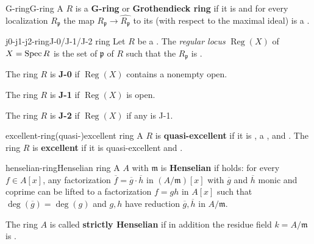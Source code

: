 \begin{topic}{G-ring}{G-ring}
    A  $R$ is a \textbf{G-ring} or \textbf{Grothendieck ring} if it is  and for every localization $R_{\mathfrak{p}}$ the map $R_{\mathfrak{p}} \to \widehat{R_{\mathfrak{p}}}$ to its  (with respect to the maximal ideal) is a .
\end{topic}

\begin{topic}{j0-j1-j2-ring}{J-0/J-1/J-2 ring}
    Let $R$ be a  . The \textit{regular locus} $\operatorname{Reg}(X)$ of $X = \operatorname{Spec} R$ is the set of  $\mathfrak{p}$ of $R$ such that the  $R_\mathfrak{p}$ is .
    
    The ring $R$ is \textbf{J-0} if $\operatorname{Reg}(X)$ contains a nonempty open.
    
    The ring $R$ is \textbf{J-1} if $\operatorname{Reg}(X)$ is open.
    
    The ring $R$ is \textbf{J-2} if $\operatorname{Reg}(X)$ if any  is J-1.
\end{topic}

\begin{topic}{excellent-ring}{(quasi-)excellent ring}
    A  $R$ is \textbf{quasi-excellent} if it is , a , and .
    The ring $R$ is \textbf{excellent} if it is quasi-excellent and .
\end{topic}

\begin{topic}{henselian-ring}{Henselian ring}
    A  $A$ with  $\mathfrak{m}$ is \textbf{Henselian} if  holds: for every  $f \in A[x]$, any factorization $\overline{f} = \overline{g} \cdot \overline{h}$ in $(A/\mathfrak{m})[x]$ with $\overline{g}$ and $\overline{h}$ monic and coprime can be lifted to a factorization $f = gh$ in $A[x]$ such that $\deg(\overline{g}) = \deg(g)$ and $g, h$ have reduction $\overline{g}, \overline{h}$ in $A/\mathfrak{m}$.
    
    The ring $A$ is called \textbf{strictly Henselian} if in addition the residue field $k = A/\mathfrak{m}$ is .
\end{topic}

